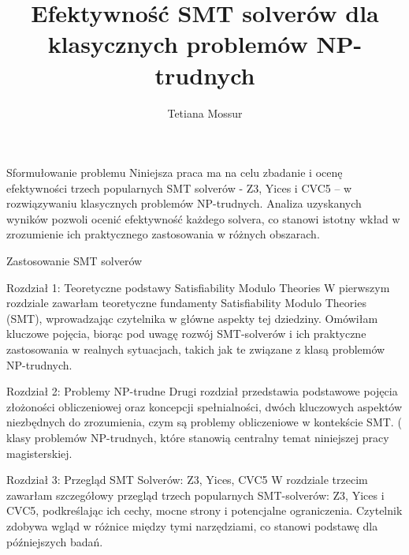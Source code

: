 \documentclass{beamer}
\title{Efektywność SMT solverów dla klasycznych problemów NP-trudnych}
\author{Tetiana Mossur}
\institute[UJD]
{
	Uniwersytet Jana Długosza w Częstochowie \\
	\medskip
}
\date{}
\begin{document}
	
	\begin{frame}
		\titlepage
	\end{frame}


	\begin{frame}{Sformułowanie problemu}
		Niniejsza praca ma na celu zbadanie i ocenę efektywności trzech popularnych SMT solverów - Z3, Yices i CVC5 –  w rozwiązywaniu klasycznych problemów NP-trudnych. Analiza uzyskanych wyników pozwoli ocenić efektywność każdego solvera, co stanowi istotny wkład w zrozumienie ich praktycznego zastosowania w różnych obszarach.
	\end{frame}

		
	\begin{frame}{Zastosowanie SMT solverów}
		
	\end{frame}
	
	
	\begin{frame}{Rozdział 1: Teoretyczne podstawy Satisfiability Modulo Theories}
		W pierwszym rozdziale zawarłam teoretyczne fundamenty Satisfiability Modulo Theories (SMT), wprowadzając czytelnika  w główne aspekty tej dziedziny. Omówiłam kluczowe pojęcia, biorąc pod uwagę rozwój SMT-solverów i ich praktyczne zastosowania w realnych sytuacjach, takich jak te związane z klasą problemów NP-trudnych.
	\end{frame}
	
	
	\begin{frame}{Rozdział 2: Problemy NP-trudne}
		Drugi rozdział przedstawia podstawowe pojęcia złożoności obliczeniowej oraz koncepcji spełnialności, dwóch kluczowych aspektów niezbędnych do zrozumienia, czym są problemy obliczeniowe w kontekście SMT. (%
		klasy problemów NP-trudnych, które stanowią centralny temat niniejszej pracy magisterskiej.
	\end{frame}
	
	
	\begin{frame}{Rozdział 3: Przegląd SMT Solverów: Z3, Yices, CVC5}
		W rozdziale trzecim zawarłam szczegółowy przegląd trzech popularnych SMT-solverów: 
		Z3, 
		Yices i 
		CVC5, 
		podkreślając ich cechy, mocne strony i potencjalne ograniczenia. 
		Czytelnik zdobywa wgląd w różnice między tymi narzędziami, co stanowi podstawę dla późniejszych badań.
	\end{frame}
	
\end{document}
